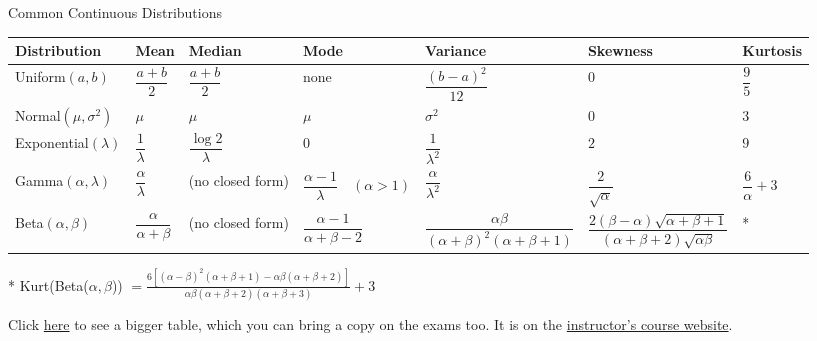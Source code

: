\begin{frame}{Common Continuous Distributions}

\scriptsize

\renewcommand{\arraystretch}{1.45}

\begin{center}
\begin{tabular}{p{2.1cm} p{1.7cm} p{1.7cm} p{1.8cm} p{1.8cm} p{1.8cm} p{1.8cm}}
\toprule
\textbf{Distribution}
&
\textbf{Mean}
&
\textbf{Median}
&
\textbf{Mode}
&
\textbf{Variance}
&
\textbf{Skewness}
&
\textbf{Kurtosis}
\\
\midrule

Uniform\((a,b)\)
&
\(
\dfrac{a+b}{2}
\)
&
\(
\dfrac{a+b}{2}
\)
&
none
&
\(
\dfrac{(b-a)^2}{12}
\)
&
\(0\)
&
\(
\dfrac95
\)
\\

\midrule

Normal\((\mu,\sigma^2)\)
&
\(\mu\)
&
\(\mu\)
&
\(\mu\)
&
\(\sigma^2\)
&
\(0\)
&
\(3\)
\\

\midrule

Exponential\((\lambda)\)
&
\(
\dfrac1\lambda
\)
&
\(
\dfrac{\log 2}{\lambda}
\)
&
\(0\)
&
\(
\dfrac1{\lambda^2}
\)
&
\(2\)
&
\(9\)
\\

\midrule

Gamma\((\alpha,\lambda)\)
&
\(
\dfrac{\alpha}{\lambda}
\)
&
(no closed form)
&
\(
\dfrac{\alpha-1}{\lambda}
\quad (\alpha>1)
\)
&
\(
\dfrac{\alpha}{\lambda^2}
\)
&
\(
\dfrac{2}{\sqrt{\alpha}}
\)
&
\(
\dfrac{6}{\alpha}+3
\)
\\

\midrule

Beta\((\alpha,\beta)\)
&
\(
\dfrac{\alpha}{\alpha+\beta}
\)
&
(no closed form)
&
\(
\dfrac{\alpha-1}{\alpha+\beta-2}
\)
&
\(
\dfrac{\alpha\beta}
{(\alpha+\beta)^2(\alpha+\beta+1)}
\)
&
\(
\dfrac{2(\beta-\alpha)\sqrt{\alpha+\beta+1}}
{(\alpha+\beta+2)\sqrt{\alpha\beta}}
\)
&
*
\\

\bottomrule
\end{tabular}

\end{center}

* Kurt(Beta($\alpha, \beta$)) $=\frac{
6\left[
(\alpha-\beta)^2(\alpha+\beta+1)
-
\alpha\beta(\alpha+\beta+2)
\right]
}{
\alpha\beta(\alpha+\beta+2)(\alpha+\beta+3)
}
+3$ 

Click \href{https://armanjg.github.io/MATH-394-Probability-1-v2/distributions-v1.pdf}{here} to see a bigger table, which you can bring a copy on the exams too. It is on the \href{https://armanjg.github.io/MATH-394-Probability-1-v2/}{instructor's course website}.

\end{frame}
